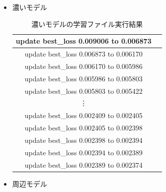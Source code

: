 \documentclass[dvipdfmx]{jsarticle}
\begin{document}
\begin{itemize}
    \newpage
    
    \item 濃いモデル
    \begin{table}[H]
        \centering
        \begin{tabular}{|c|c|}
            \hline
            update best\_loss 0.009006 to 0.006873 \\
            \hline
            
            update best\_loss 0.006873 to 0.006170 \\
            \hline
            
            update best\_loss 0.006170 to 0.005986 \\
            \hline
            
            update best\_loss 0.005986 to 0.005803 \\
            \hline
            
            update best\_loss 0.005803 to 0.005422 \\
            \hline
            
            \vdots \\
            \hline
            
            update best\_loss 0.002409 to 0.002405 \\
            \hline
            
            update best\_loss 0.002405 to 0.002398 \\
            \hline
            
            update best\_loss 0.002398 to 0.002394 \\
            \hline
            
            update best\_loss 0.002394 to 0.002389 \\
            \hline
            
            update best\_loss 0.002389 to 0.002374 \\
            \hline
            
    
        \end{tabular}
        \caption{濃いモデルの学習ファイル実行結果}
        \label{makemodel3}
    \end{table}


    
    \item 周辺モデル

        \begin{table}[H]
        \centering
        \begin{tabular}{|c|c|}
        

\end{tabular}
\end{table}
\end{itemize}
\end{document}
